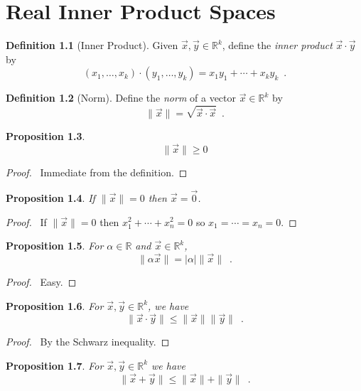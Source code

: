 \documentclass{book}
\let\qed\relax
\newtheorem{prop}{Proposition}[chapter]
\theoremstyle{definition}
\newtheorem{df}[prop]{Definition}
\begin{document}
\chapter{Real Inner Product Spaces}

\begin{df}[Inner Product]
Given $\vec{x}, \vec{y} \in \mathbb{R}^k$, define the \emph{inner product} $\vec{x} \cdot \vec{y}$ by
\[ (x_1, \ldots, x_k) \cdot (y_1, \ldots, y_k) = x_1 y_1 + \cdots + x_k y_k \enspace . \]
\end{df}

\begin{df}[Norm]
Define the \emph{norm} of a vector $\vec{x} \in \mathbb{R}^k$ by
\[ \|\vec{x}\| = \sqrt{\vec{x} \cdot \vec{x}} \enspace . \]
\end{df}

\begin{prop}
\[ \|\vec{x}\| \geq 0 \]
\end{prop}

\begin{proof}
\pf\ Immediate from the definition. \qed
\end{proof}

\begin{prop}
If $\|\vec{x}\| = 0$ then $\vec{x} = \vec{0}$.
\end{prop}

\begin{proof}
\pf\ If $\|\vec{x}\| = 0$ then $x_1^2 + \cdots + x_n^2 = 0$ so $x_1 = \cdots = x_n = 0$. \qed
\end{proof}

\begin{prop}
For $\alpha \in \mathbb{R}$ and $\vec{x} \in \mathbb{R}^k$,
\[ \| \alpha \vec{x} \| = |\alpha| \| \vec{x} \| \enspace . \]
\end{prop}

\begin{proof}
\pf\ Easy. \qed
\end{proof}

\begin{prop}
\label{prop:norm_x_dot_y}
For $\vec{x}, \vec{y} \in \mathbb{R}^k$, we have
\[ \| \vec{x} \cdot \vec{y} \| \leq \| \vec{x} \| \| \vec{y} \| \enspace . \]
\end{prop}

\begin{proof}
\pf\ By the Schwarz inequality. \qed
\end{proof}

\begin{prop}
For $\vec{x}, \vec{y} \in \mathbb{R}^k$ we have
\[ \| \vec{x} + \vec{y} \| \leq \| \vec{x} \| + \| \vec{y} \| \enspace . \]
\end{prop}
\end{document}
